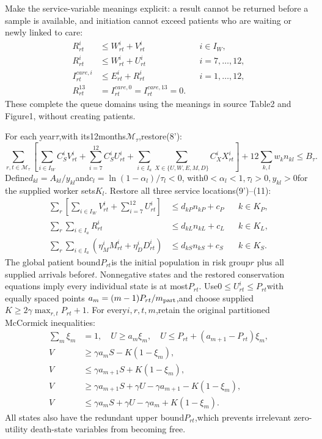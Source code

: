 \documentclass{article}
\begin{document}
Make the service-variable meanings explicit: a result cannot be returned
before a sample is available, and initiation cannot exceed patients who
are waiting or newly linked to care:
\begin{align*}
R^i_{rt}&\le W^i_{rt}+V^i_{rt}&&i\in I_W,\\
R^i_{rt}&\le W^i_{rt}+U^i_{rt}&&i=7,\ldots,12,\\
I^{care,i}_{rt}&\le E^i_{rt}+R^i_{rt}&&i=1,\ldots,12,\\
R^{13}_{rt}&=I^{care,0}_{rt}=I^{care,13}_{rt}=0.
\end{align*}
These complete the queue domains using the meanings in source Table2 and
Figure1, without creating patients.

For each year$\tau$,with its12months$\mathcal M_\tau$,restore(8'):
\[
\sum_{r,t\in\mathcal M_\tau}
\left[\sum_{i\in I_W}C_S^iV^i_{rt}
+\sum_{i=7}^{12}C_S^iU^i_{rt}
+\sum_{i\in I_a}\sum_{X\in\{U,W,E,M,D\}}C_X^iX^i_{rt}\right]
+12\sum_{k,l}w_kn_{kl}\le B_\tau .
\]
Define$d_{kl}=A_{kl}/y_{kl}$and$c_l=\ln(1-\alpha_l)/\tau_l<0$,
with$0<\alpha_l<1,\tau_l>0,y_{kl}>0$for the supplied worker sets$K_l$.
Restore all three service locations(9')--(11):
\begin{align*}
\sum_r\left[\sum_{i\in I_W}V^i_{rt}
+\sum_{i=7}^{12}U^i_{rt}\right]&\le d_{kP}n_{kP}+c_P&&k\in K_P,\\
\sum_r\sum_{i\in I_a}R^i_{rt}&\le d_{kL}n_{kL}+c_L&&k\in K_L,\\
\sum_r\sum_{i\in I_a}(\eta_M^iM^i_{rt}+\eta_D^iD^i_{rt})
 &\le d_{kS}n_{kS}+c_S&&k\in K_S.
\end{align*}
The global patient bound$P_{rt}$is the initial population in risk group$r$
plus all supplied arrivals before$t$. Nonnegative states and the restored
conservation equations imply every individual state is at most$P_{rt}$.
Use$0\le U^i_{rt}\le P_{rt}$with equally spaced points
$a_m=(m-1)P_{rt}/m_{\rm part}$,and choose supplied$K\ge2\gamma\max_{r,t}P_{rt}+1$.
For every$i,r,t,m$,retain the original partitioned McCormick inequalities:
\begin{align*}
\sum_m\xi_m&=1,\quad U\ge a_m\xi_m,\quad
U\le P_{rt}+(a_{m+1}-P_{rt})\xi_m,\\
V&\ge\gamma a_mS-K(1-\xi_m),\\
V&\le\gamma a_{m+1}S+K(1-\xi_m),\\
V&\ge\gamma a_{m+1}S+\gamma U-\gamma a_{m+1}-K(1-\xi_m),\\
V&\le\gamma a_mS+\gamma U-\gamma a_m+K(1-\xi_m).
\end{align*}
All states also have the redundant upper bound$P_{rt}$,which prevents
irrelevant zero-utility death-state variables from becoming free.
\end{document}

